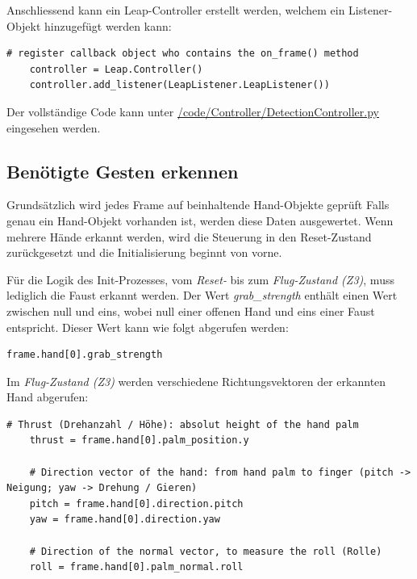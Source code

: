 Anschliessend kann ein Leap-Controller erstellt werden, welchem ein Listener-Objekt hinzugefügt werden kann:
\begin{lstlisting}[style=lstStyleCpp]
	# register callback object who contains the on_frame() method
	controller = Leap.Controller()
	controller.add_listener(LeapListener.LeapListener())
\end{lstlisting}

Der vollständige Code kann unter \href{https://github.com/MrJack91/droneGestures/blob/master/code/Controller/DetectionController.py}{/code/Controller/DetectionController.py} eingesehen werden.

\subsection{Benötigte Gesten erkennen}
Grundsätzlich wird jedes Frame auf beinhaltende Hand-Objekte geprüft
Falls genau ein Hand-Objekt vorhanden ist, werden diese Daten ausgewertet. Wenn mehrere Hände erkannt werden, wird die Steuerung in den Reset-Zustand zurückgesetzt und die Initialisierung beginnt von vorne.

Für die Logik des Init-Prozesses, vom \textit{Reset-} bis zum \textit{Flug-Zustand (Z3)}, muss lediglich die Faust erkannt werden.
Der Wert \textit{grab\_strength} enthält einen Wert zwischen null und eins, wobei null einer offenen Hand und eins einer Faust entspricht.
Dieser Wert kann wie folgt abgerufen werden:

\begin{lstlisting}[style=lstStyleCpp]
	frame.hand[0].grab_strength
\end{lstlisting}

Im \textit{Flug-Zustand (Z3)} werden verschiedene Richtungsvektoren der erkannten Hand abgerufen:

\begin{lstlisting}[style=lstStyleCpp]
	# Thrust (Drehanzahl / Höhe): absolut height of the hand palm
	thrust = frame.hand[0].palm_position.y
	
	# Direction vector of the hand: from hand palm to finger (pitch -> Neigung; yaw -> Drehung / Gieren)
	pitch = frame.hand[0].direction.pitch
	yaw = frame.hand[0].direction.yaw
	
	# Direction of the normal vector, to measure the roll (Rolle)
	roll = frame.hand[0].palm_normal.roll
\end{lstlisting}

